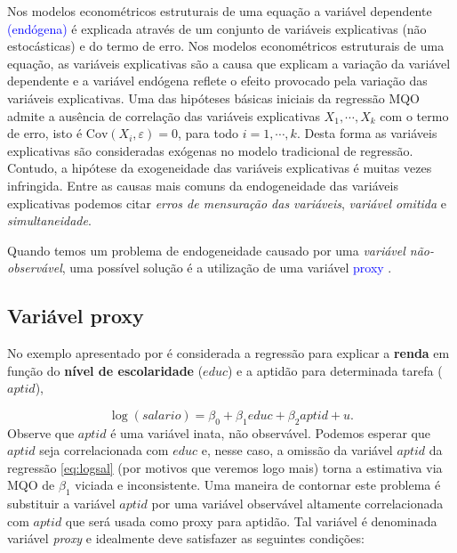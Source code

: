 \documentclass[
]{book}
\theoremstyle{definition}
\theoremstyle{definition}
\theoremstyle{definition}
\theoremstyle{remark}
\begin{document}
Nos modelos econométricos estruturais de uma equação a variável dependente \textcolor{blue}{ (endógena) } é explicada através de um conjunto de variáveis explicativas (não estocásticas) e do termo de erro. Nos modelos econométricos estruturais de uma equação, as variáveis explicativas são a causa que explicam a variação da variável dependente e a variável endógena reflete o efeito provocado pela variação das variáveis explicativas.
Uma das hipóteses básicas iniciais da regressão MQO admite a ausência de correlação das variáveis explicativas \(X_1,\cdots,X_k\) com o termo de erro, isto é \(\mbox{Cov}(X_i,\varepsilon)=0\), para todo \(i=1,\cdots,k\). Desta forma as variáveis explicativas são consideradas exógenas no modelo tradicional de regressão. Contudo, a hipótese da exogeneidade das variáveis explicativas é muitas vezes infringida. Entre as causas mais comuns da endogeneidade das variáveis explicativas podemos citar \emph{erros de mensuração das variáveis}, \emph{variável omitida} e \emph{simultaneidade}.

Quando temos um problema de endogeneidade causado por uma \emph{variável não-observável}, uma possível solução é a utilização de uma variável \textcolor{blue}{ proxy } .

\hypertarget{variuxe1vel-proxy}{%
\subsection{Variável proxy}\label{variuxe1vel-proxy}}

No exemplo apresentado por \citep{wooldridge2016} é considerada a regressão para explicar a \textbf{renda} em função do \textbf{nível de escolaridade} (\(educ\)) e a aptidão para determinada tarefa (\(aptid\)),

\begin{equation}
  \log(salario)=\beta_0+\beta_1 educ+\beta_2 aptid+u.
  \label{eq:logsal}
 \end{equation}
Observe que \(aptid\) é uma variável inata, não observável. Podemos esperar que \(aptid\) seja correlacionada com \(educ\) e, nesse caso, a omissão da variável \(aptid\) da regressão \eqref{eq:logsal} (por motivos que veremos logo mais) torna a estimativa via MQO de \(\beta_1\) viciada e inconsistente. Uma maneira de contornar este problema é substituir a variável \(aptid\) por uma variável observável altamente correlacionada com \(aptid\) que será usada como proxy para aptidão. Tal variável é denominada variável \emph{proxy} e idealmente deve satisfazer as seguintes condições:
\end{document}
